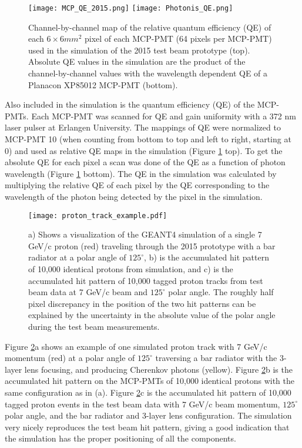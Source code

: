 \begin{figure}[!htb]
	\centering
	\texttt{[image: MCP\_QE\_2015.png]}
	\texttt{[image: Photonis\_QE.png]}
	\caption{Channel-by-channel map of the relative quantum efficiency (QE) of each $6\times6\unit{mm}^2$ pixel of each MCP-PMT (64 pixels per MCP-PMT) used in the simulation of the 2015 test beam prototype (top). Absolute QE values in the simulation are the product of the channel-by-channel values with the wavelength dependent QE of a Planacon XP85012 MCP-PMT (bottom).}
	\label{fig:quantum_efficiency}
\end{figure}

Also included in the simulation is the quantum efficiency (QE) of the MCP-PMTs. Each MCP-PMT was scanned for QE and gain uniformity with a 372 nm laser pulser at Erlangen University. The mappings of QE were normalized to MCP-PMT 10 (when counting from bottom to top and left to right, starting at 0) and used as relative QE maps in the simulation (Figure \ref{fig:quantum_efficiency} top). To get the absolute QE for each pixel a scan was done of the QE as a function of photon wavelength (Figure \ref{fig:quantum_efficiency} bottom). The QE in the simulation was calculated by multiplying the relative QE of each pixel by the QE corresponding to the wavelength of the photon being detected by the pixel in the simulation.

\begin{figure}[!htb]
	\centering
	\texttt{[image: proton\_track\_example.pdf]}
	\caption{a) Shows a visualization of the GEANT4 simulation of a single 7 GeV/c proton (red) traveling through the 2015 prototype with a bar radiator at a polar angle of $125^{\circ}$, b) is the accumulated hit pattern of 10,000 identical protons from simulation, and c) is the accumulated hit pattern of 10,000 tagged proton tracks from test beam data at 7 GeV/c beam and $125^{\circ}$ polar angle. The roughly half pixel discrepancy in the position of the two hit patterns can be explained by the uncertainty in the absolute value of the polar angle during the test beam measurements.}
	\label{fig:proton_track_example}
\end{figure}

Figure \ref{fig:proton_track_example}a shows an example of one simulated proton track with 7 GeV/c momentum (red) at a polar angle of $125^{\circ}$ traversing a bar radiator with the 3-layer lens focusing, and producing Cherenkov photons (yellow). Figure \ref{fig:proton_track_example}b is the accumulated hit pattern on the MCP-PMTs of 10,000 identical protons with the same configuration as in (a). Figure \ref{fig:proton_track_example}c is the accumulated hit pattern of 10,000 tagged proton events in the test beam data with 7 GeV/c beam momentum, $125^{\circ}$ polar angle, and the bar radiator and 3-layer lens configuration. The simulation very nicely reproduces the test beam hit pattern, giving a good indication that the simulation has the proper positioning of all the components.

